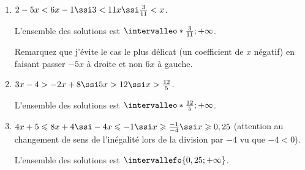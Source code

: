 %
%
%
%
\begin{exr}
    \begin{enumerate}[label=\textbf{\alph*.}]
    \item $2-5x<6x-1 \ssi 3<11x \ssi \frac3{11}<x$. 
    
    L'ensemble des solutions est $\intervalleo*{\frac3{11};+\infty}$.

   Remarquez que j'évite le cas le plus délicat (un coefficient de $x$ négatif) en faisant passer $-5x$ à droite et non $6x$ à gauche. 
    \item $3x-4>-2x+8 \ssi 5x>12 \ssi x>\frac{12}{5}$.

    L'ensemble des solutions est $\intervalleo*{\frac{12}5;+\infty}$.
    \item $4x+5\leqslant8x+4 \ssi -4x \leqslant -1 \ssi x \geqslant \frac{-1}{-4} \ssi x \geqslant 0,25$ (attention au changement de sens de l'inégalité lors de la division par $-4$ vu que $-4<0$).

    L'ensemble des solutions est $\intervallefo{0,25;+\infty}$.
    \end{enumerate}
\end{exr}
%
%
%
